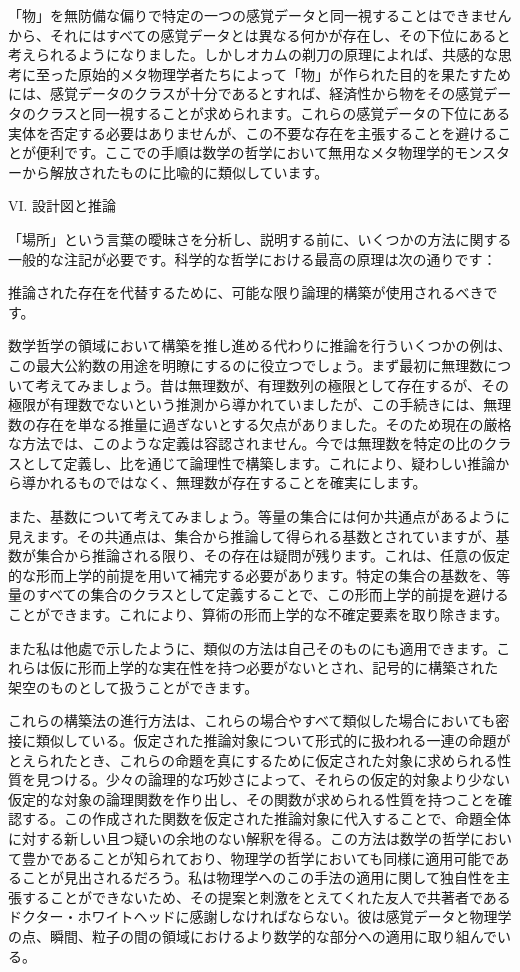 \documentclass[a4paper,11pt,openany]{ltjsbook}
\begin{document}
「物」を無防備な偏りで特定の一つの感覚データと同一視することはできませんから、それにはすべての感覚データとは異なる何かが存在し、その下位にあると考えられるようになりました。しかしオカムの剃刀の原理によれば、共感的な思考に至った原始的メタ物理学者たちによって「物」が作られた目的を果たすためには、感覚データのクラスが十分であるとすれば、経済性から物をその感覚データのクラスと同一視することが求められます。これらの感覚データの下位にある実体を否定する必要はありませんが、この不要な存在を主張することを避けることが便利です。ここでの手順は数学の哲学において無用なメタ物理学的モンスターから解放されたものに比喩的に類似しています。

VI. 設計図と推論

「場所」という言葉の曖昧さを分析し、説明する前に、いくつかの方法に関する一般的な注記が必要です。科学的な哲学における最高の原理は次の通りです：

  推論された存在を代替するために、可能な限り論理的構築が使用されるべきです。

数学哲学の領域において構築を推し進める代わりに推論を行ういくつかの例は、この最大公約数の用途を明瞭にするのに役立つでしょう。まず最初に無理数について考えてみましょう。昔は無理数が、有理数列の極限として存在するが、その極限が有理数でないという推測から導かれていましたが、この手続きには、無理数の存在を単なる推量に過ぎないとする欠点がありました。そのため現在の厳格な方法では、このような定義は容認されません。今では無理数を特定の比のクラスとして定義し、比を通じて論理性で構築します。これにより、疑わしい推論から導かれるものではなく、無理数が存在することを確実にします。

また、基数について考えてみましょう。等量の集合には何か共通点があるように見えます。その共通点は、集合から推論して得られる基数とされていますが、基数が集合から推論される限り、その存在は疑問が残ります。これは、任意の仮定的な形而上学的前提を用いて補完する必要があります。特定の集合の基数を、等量のすべての集合のクラスとして定義することで、この形而上学的前提を避けることができます。これにより、算術の形而上学的な不確定要素を取り除きます。

また私は他處で示したように、類似の方法は自己そのものにも適用できます。これらは仮に形而上学的な実在性を持つ必要がないとされ、記号的に構築された架空のものとして扱うことができます。

これらの構築法の進行方法は、これらの場合やすべて類似した場合においても密接に類似している。仮定された推論対象について形式的に扱われる一連の命題がとえられたとき、これらの命題を真にするために仮定された対象に求められる性質を見つける。少々の論理的な巧妙さによって、それらの仮定的対象より少ない仮定的な対象の論理関数を作り出し、その関数が求められる性質を持つことを確認する。この作成された関数を仮定された推論対象に代入することで、命題全体に対する新しい且つ疑いの余地のない解釈を得る。この方法は数学の哲学において豊かであることが知られており、物理学の哲学においても同様に適用可能であることが見出されるだろう。私は物理学へのこの手法の適用に関して独自性を主張することができないため、その提案と刺激をとえてくれた友人で共著者であるドクター・ホワイトヘッドに感謝しなければならない。彼は感覚データと物理学の点、瞬間、粒子の間の領域におけるより数学的な部分への適用に取り組んでいる。
\end{document}
